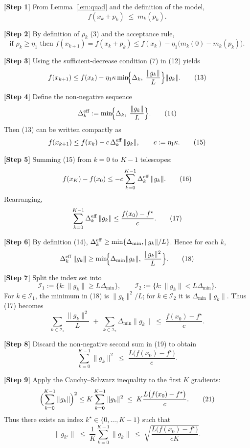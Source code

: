 \documentclass{article}
\begin{document}
\noindent\textbf{[Step 1]}  From Lemma~\ref{lem:quad} and the definition of the model,
\[
f(x_k+p_k)\;\le\; m_k(p_k).
\tag{11}
\]

\noindent\textbf{[Step 2]}  By definition of $\rho_k$ (3) and the acceptance rule,
\[
\text{if }\rho_k\ge\eta_1\text{ then } 
f(x_{k+1}) = f(x_k+p_k) \le f(x_k)-\eta_1\bigl(m_k(0)-m_k(p_k)\bigr).
\tag{12}
\]

\noindent\textbf{[Step 3]}  Using the sufficient‑decrease condition (7) in (12) yields
\[
f(x_{k+1})\le f(x_k)-\eta_1\kappa
\min\!\Bigl\{\Delta_k,\;\frac{\|g_k\|}{L}\Bigr\}\|g_k\|.
\tag{13}
\]

\noindent\textbf{[Step 4]}  Define the non‑negative sequence
\[
\Delta_k^{\rm eff}:=
\min\!\Bigl\{\Delta_k,\;\frac{\|g_k\|}{L}\Bigr\}.
\tag{14}
\]
Then (13) can be written compactly as
\[
f(x_{k+1})\le f(x_k)-c\,\Delta_k^{\rm eff}\,\|g_k\|,
\qquad c:=\eta_1\kappa.
\tag{15}
\]

\noindent\textbf{[Step 5]}  Summing (15) from $k=0$ to $K-1$ telescopes:
\[
f(x_K)-f(x_0)\le -c\sum_{k=0}^{K-1}\Delta_k^{\rm eff}\,\|g_k\|.
\tag{16}
\]
Rearranging,
\[
\sum_{k=0}^{K-1}\Delta_k^{\rm eff}\,\|g_k\|
\le \frac{f(x_0)-f^\star}{c}.
\tag{17}
\]

\noindent\textbf{[Step 6]}  By definition (14), $\Delta_k^{\rm eff}\ge \min\{\Delta_{\min},\|g_k\|/L\}$.  
Hence for each $k$,
\[
\Delta_k^{\rm eff}\,\|g_k\|
\ge
\min\!\Bigl\{\Delta_{\min}\|g_k\|,\;\frac{\|g_k\|^{2}}{L}\Bigr\}.
\tag{18}
\]

\noindent\textbf{[Step 7]}  Split the index set into
\[
\mathcal{I}_1:=\{k:\|g_k\|\ge L\Delta_{\min}\},
\qquad
\mathcal{I}_2:=\{k:\|g_k\|< L\Delta_{\min}\}.
\]
For $k\in\mathcal{I}_1$, the minimum in (18) is $\|g_k\|^{2}/L$; for $k\in\mathcal{I}_2$ it is $\Delta_{\min}\|g_k\|$.
Thus (17) becomes
\[
\sum_{k\in\mathcal{I}_1}\frac{\|g_k\|^{2}}{L}
\;+\;
\sum_{k\in\mathcal{I}_2}\Delta_{\min}\|g_k\|
\;\le\;
\frac{f(x_0)-f^\star}{c}.
\tag{19}
\]

\noindent\textbf{[Step 8]}  Discard the non‑negative second sum in (19) to obtain
\[
\sum_{k=0}^{K-1}\|g_k\|^{2}
\;\le\;
\frac{L\bigl(f(x_0)-f^\star\bigr)}{c}.
\tag{20}
\]

\noindent\textbf{[Step 9]}  Apply the Cauchy–Schwarz inequality to the first $K$ gradients:
\[
\Bigl(\sum_{k=0}^{K-1}\|g_k\|\Bigr)^{2}
\le K\sum_{k=0}^{K-1}\|g_k\|^{2}
\;\le\;
K\frac{L\bigl(f(x_0)-f^\star\bigr)}{c}.
\tag{21}
\]
Thus there exists an index $k^\star\in\{0,\dots,K-1\}$ such that
\[
\|g_{k^\star}\|
\;\le\;
\frac{1}{K}\sum_{k=0}^{K-1}\|g_k\|
\;\le\;
\sqrt{\frac{L\bigl(f(x_0)-f^\star\bigr)}{cK}}.
\tag{22}
\]
\end{document}
